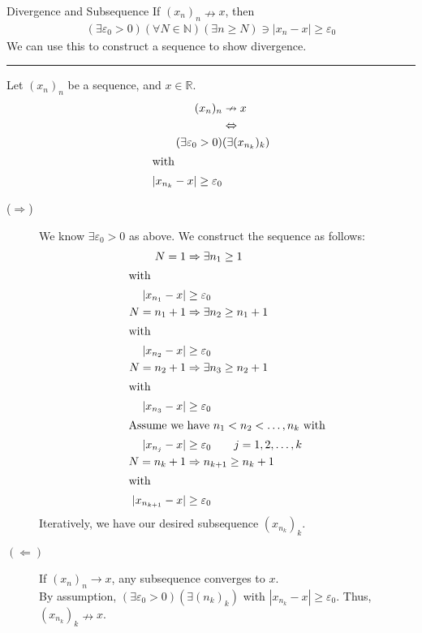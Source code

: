 \documentclass[8pt]{extarticle}
\newcommand{\N}{\mathbb{N}}
\newcommand{\R}{\mathbb{R}}
\begin{document}
  \begin{problem}{Divergence and Subsequence}
    If $(x_n)_n \nrightarrow x$, then
    \begin{align*}
      \left(\exists \varepsilon_0> 0\right)\left(\forall N\in\N\right)\left(\exists n\geq N\right) \ni |x_n-x| \geq \varepsilon_0
    \end{align*}
    We can use this to construct a sequence to show divergence.\\
    \vspace{4pt}
    \rule{\textwidth}{0.4pt}
    \vspace{4pt}
    Let $(x_n)_n$ be a sequence, and $x\in\R$.
    \begin{align*}
      (x_n)_n &\nrightarrow x \\
              &\Leftrightarrow\\
      (\exists \varepsilon_0>0)&(\exists (x_{n_k})_k)\\
      \shortintertext{with}
      |x_{n_k} - x| \geq \varepsilon_0
    \end{align*}
    \tcblower
    \begin{description}
      \item[($\Rightarrow$)] We know $\exists \varepsilon_0 > 0$ as above. We construct the sequence as follows:
        \begin{align*}
          N = 1 &\Rightarrow \exists n_1 \geq 1\\
          \shortintertext{with}
          |x_{n_1} - x |&\geq \varepsilon_0\\
          N = n_1 + 1 &\Rightarrow \exists n_2 \geq n_1 + 1\\
          \shortintertext{with}
          |x_{n_2} - x| &\geq \varepsilon_0\\
          N = n_2 + 1 &\Rightarrow \exists n_3 \geq n_2 + 1\\
          \shortintertext{with}
          |x_{n_3} - x| &\geq \varepsilon_0\\
          \shortintertext{Assume we have $n_1 < n_2< \dots, n_k$ with}
          |x_{n_j} - x| &\geq \varepsilon_0 \tag*{$j = 1,2,\dots,k$}\\
          N = n_k + 1 &\Rightarrow n_{k+1} \geq n_k + 1\\
          \shortintertext{with}
          |x_{n_{k+1}} - x| &\geq \varepsilon_0
        \end{align*}
        Iteratively, we have our desired subsequence $(x_{n_k})_k$.
      \item[$(\Leftarrow)$] If $(x_n)_n\rightarrow x$, any subsequence converges to $x$.\\

        By assumption, $\left(\exists \varepsilon_0 >0\right)\left(\exists (n_k)_k\right)$ with $|x_{n_k} - x| \geq \varepsilon_0$. Thus, $(x_{n_k})_k \nrightarrow x$.
    \end{description}
  \end{problem}
\end{document}
